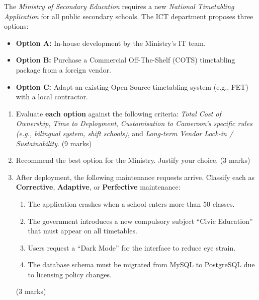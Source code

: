 \documentclass[11pt]{article}
\begin{document}
\begin{exercice}
The \emph{Ministry of Secondary Education} requires a new \emph{National Timetabling Application} for all public secondary schools. The ICT department proposes three options:
\begin{itemize}
    \item \textbf{Option A:} In-house development by the Ministry's IT team.
    \item \textbf{Option B:} Purchase a Commercial Off-The-Shelf (COTS) timetabling package from a foreign vendor.
    \item \textbf{Option C:} Adapt an existing Open Source timetabling system (e.g., FET) with a local contractor.
\end{itemize}

\begin{enumerate}
    \item Evaluate \textbf{each option} against the following criteria: \emph{Total Cost of Ownership}, \emph{Time to Deployment}, \emph{Customisation to Cameroon's specific rules (e.g., bilingual system, shift schools)}, and \emph{Long-term Vendor Lock-in / Sustainability}. (9 marks)
    \item Recommend the best option for the Ministry. Justify your choice. (3 marks)
    \item After deployment, the following maintenance requests arrive. Classify each as \textbf{Corrective}, \textbf{Adaptive}, or \textbf{Perfective} maintenance:
        \begin{enumerate}
            \item The application crashes when a school enters more than 50 classes.
            \item The government introduces a new compulsory subject ``Civic Education'' that must appear on all timetables.
            \item Users request a ``Dark Mode'' for the interface to reduce eye strain.
            \item The database schema must be migrated from MySQL to PostgreSQL due to licensing policy changes.
        \end{enumerate}
    (3 marks)
\end{enumerate}
\end{exercice}
\end{document}
